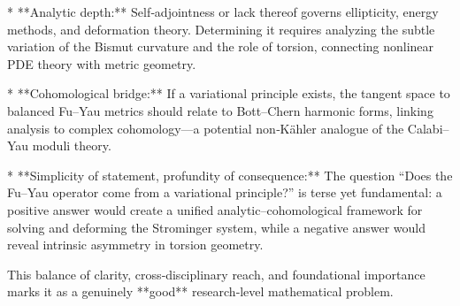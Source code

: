 * **Analytic depth:**  
Self‑adjointness or lack thereof governs ellipticity, energy methods, and deformation theory. Determining it requires analyzing the subtle variation of the Bismut curvature and the role of torsion, connecting nonlinear PDE theory with metric geometry.

* **Cohomological bridge:**  
If a variational principle exists, the tangent space to balanced Fu–Yau metrics should relate to Bott–Chern harmonic forms, linking analysis to complex cohomology—a potential non‑Kähler analogue of the Calabi–Yau moduli theory.

* **Simplicity of statement, profundity of consequence:**  
The question “Does the Fu–Yau operator come from a variational principle?” is terse yet fundamental: a positive answer would create a unified analytic–cohomological framework for solving and deforming the Strominger system, while a negative answer would reveal intrinsic asymmetry in torsion geometry.

This balance of clarity, cross‑disciplinary reach, and foundational importance marks it as a genuinely **good** research‑level mathematical problem.